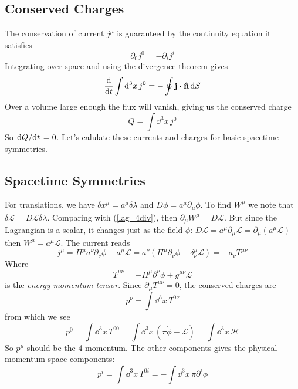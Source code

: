\subsection{Conserved Charges}
The conservation of current $j^\mu$ is guaranteed by the continuity equation it satisfies
\begin{equation}
    \partial_0j^0=-\partial_ij^i
\end{equation}
Integrating over space and using the divergence theorem gives
\begin{equation}
    \dv{t}\int\dd^3x\,j^0=-\oint{\vb{j}}\vdot\vu{n}\,\dd S
\end{equation}
Over a volume large enough the flux will vanish, giving us the conserved charge 
\begin{equation}
    Q=\int\dd^3x\,j^0
\end{equation}
So $\dv*{Q}{t}=0$. Let's calulate these currents and charges for basic spacetime symmetries.
\subsection{Spacetime Symmetries}
For translations, we have $\delta x^\mu=a^\mu\delta\lambda$ and $D\phi=a^\mu\partial_\mu\phi$. To find $W^\mu$ we note that $\delta \mathcal{L}=D\mathcal{L}\delta\lambda$. Comparing with (\ref{lag_4div}), then $\partial_\mu W^\mu=D\mathcal{L}$. But since the Lagrangian is a scalar, it changes just as the field $\phi$: $D\mathcal{L}=a^\mu\partial_\mu\mathcal{L}=\partial_\mu(a^\mu\mathcal{L})$ then $W^\mu=a^\mu \mathcal{L}$. The current reads
\begin{equation}
    j^\mu=\Pi^\mu a^\nu\partial_\nu\phi-a^\mu\mathcal{L}=a^\nu(\Pi^\mu\partial_\nu\phi-\delta_\nu^\mu\mathcal{L})=-a_\nu T^{\mu\nu}
\end{equation}
Where 
\begin{equation}
    T^{\mu\nu}=-\Pi^\mu\partial^\nu\phi+g^{\mu\nu}\mathcal{L}
\end{equation}
is the \textit{energy-momentum tensor}. Since $\partial_\mu T^{\mu\nu}=0$, the conserved charges are
\begin{equation}
    p^{\nu}=\int\dd^3x\,T^{0\nu}
\end{equation}
from which we see 
\begin{equation}
    p^0=\int\dd^3x\,T^{00}=\int\dd^3x\,(\pi\dot{\phi}-\mathcal{L})=\int\dd^3x\,\mathcal{H}
\end{equation}
So $p^\mu$ should be the 4-momentum. The other components gives the physical momentum space components:
\begin{equation}
    p^i=\int\dd^3x\,T^{0i}=-\int\dd^3x\,\pi\partial^i\phi
\end{equation}

